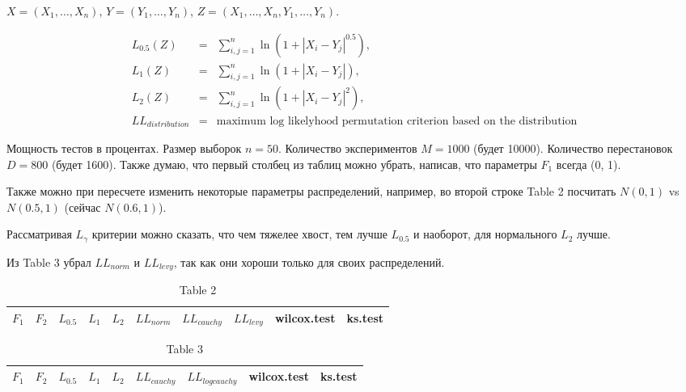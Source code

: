 \documentclass{article}
\begin{document}
$X=(X_1,\ldots,X_n)$, $Y=(Y_1,\ldots,Y_n)$, $Z=(X_1,\ldots,X_n,Y_1,\ldots,Y_n)$.

\begin{eqnarray}
  \label{L0.5}
  L_{0.5}(Z)&=&\sum_{i,j=1}^{n}{\ln(1+|X_{i}-Y_{j}|^{0.5})},\\
  \label{L1}
  L_1(Z)&=&\sum_{i,j=1}^{n}{\ln(1+|X_{i}-Y_{j}|)},\\
  \label{L2}
  L_2(Z)&=&\sum_{i,j=1}^{n}{\ln(1+|X_{i}-Y_{j}|^2)},\\
  \label{LL}
  LL_{distribution} &=& \text{maximum log likelyhood permutation criterion based on the distribution}
\end{eqnarray}

Мощность тестов в процентах. Размер выборок $n=50$. Количество экспериментов $M=1000$ (будет 10000). Количество перестановок $D=800$ (будет 1600). Также думаю, что первый столбец из таблиц можно убрать, написав, что параметры $F_1$ всегда (0, 1).

Также можно при пересчете изменить некоторые параметры распределений, например, во второй строке Table 2 посчитать $N(0, 1)$ vs $N(0.5, 1)$ (сейчас $N(0.6, 1)$).

Рассматривая $L_\gamma$ критерии можно сказать, что чем тяжелее хвост, тем лучше $L_{0.5}$ и наоборот, для нормального $L_2$ лучше.

Из Table 3 убрал $LL_{norm}$ и $LL_{levy}$, так как они хороши только для своих распределений.

\begin{longtable}{|c|c|c|c|c|c|c|c|c|c|}
  \caption{Table 2}
  \label{table:n5} \\
  \hline
  $F_1$ & $F_2$ & $L_{0.5}$ & $L_{1}$ & $L_{2}$ & $LL_{norm}$ & $LL_{cauchy}$ & $LL_{levy}$ & wilcox.test & ks.test \\ \hline
  
\end{longtable}

\begin{longtable}{|c|c|c|c|c|c|c|c|c|}
  \caption{Table 3}
  \label{table:n50} \\
  \hline
  $F_1$ & $F_2$ & $L_{0.5}$ & $L_{1}$ & $L_{2}$ & $LL_{cauchy}$ & $LL_{logcauchy}$ & wilcox.test & ks.test \\ \hline
  
\end{longtable}
\end{document}
